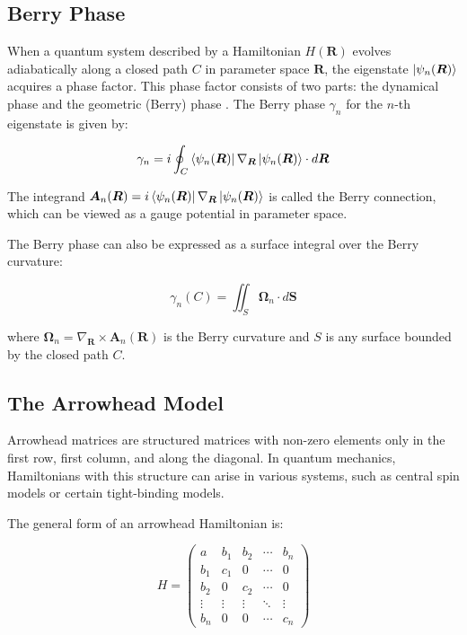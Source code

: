 \documentclass[12pt,a4paper]{article}
\begin{document}
\subsection{Berry Phase}

When a quantum system described by a Hamiltonian $H(\bm{R})$ evolves adiabatically along a closed path $C$ in parameter space $\bm{R}$, the eigenstate $\ket{\psi_n(\bm{R})}$ acquires a phase factor. This phase factor consists of two parts: the dynamical phase and the geometric (Berry) phase \citep{Berry1984}. The Berry phase $\gamma_n$ for the $n$-th eigenstate is given by:

\begin{equation}
\gamma_n = i \oint_C \bra{\psi_n(\bm{R})} \nabla_{\bm{R}} \ket{\psi_n(\bm{R})} \cdot d\bm{R}
\end{equation}

The integrand $\bm{A}_n(\bm{R}) = i \bra{\psi_n(\bm{R})} \nabla_{\bm{R}} \ket{\psi_n(\bm{R})}$ is called the Berry connection, which can be viewed as a gauge potential in parameter space.

The Berry phase can also be expressed as a surface integral over the Berry curvature:

\begin{equation}
\gamma_n(C) = \iint_S \bm{\Omega}_n \cdot d\bm{S}
\end{equation}

where $\bm{\Omega}_n = \nabla_{\bm{R}} \times \bm{A}_n(\bm{R})$ is the Berry curvature and $S$ is any surface bounded by the closed path $C$.

\subsection{The Arrowhead Model}

Arrowhead matrices are structured matrices with non-zero elements only in the first row, first column, and along the diagonal. In quantum mechanics, Hamiltonians with this structure can arise in various systems, such as central spin models or certain tight-binding models.

The general form of an arrowhead Hamiltonian is:

\begin{equation}
H = \begin{pmatrix}
a & b_1 & b_2 & \cdots & b_n \\
b_1 & c_1 & 0 & \cdots & 0 \\
b_2 & 0 & c_2 & \cdots & 0 \\
\vdots & \vdots & \vdots & \ddots & \vdots \\
b_n & 0 & 0 & \cdots & c_n
\end{pmatrix}
\end{equation}
\end{document}
